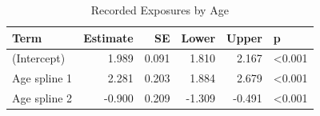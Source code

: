 \begin{table}

\caption{\label{tab:age_breaches}Recorded Exposures by Age}
\centering
\begin{tabular}[t]{lrrrrl}
\toprule
Term & Estimate & SE & Lower & Upper & p\\
\midrule
(Intercept) & 1.989 & 0.091 & 1.810 & 2.167 & <0.001\\
Age spline 1 & 2.281 & 0.203 & 1.884 & 2.679 & <0.001\\
Age spline 2 & -0.900 & 0.209 & -1.309 & -0.491 & <0.001\\
\bottomrule
\end{tabular}
\end{table}
